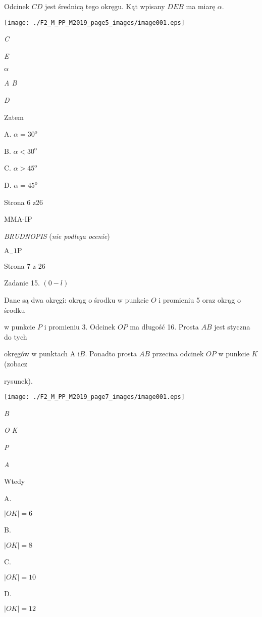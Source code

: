 \documentclass[a4paper,12pt]{article}
\begin{document}
Odcinek $CD$ jest średnicą tego okręgu. Kąt wpisany $DEB$ ma miarę $\alpha.$
\begin{center}
\texttt{[image: ./F2\_M\_PP\_M2019\_page5\_images/image001.eps]}
\end{center}
{\it C}

{\it E}

$\alpha$

{\it A  B}

{\it D}

Zatem

A. $\alpha=30^{\mathrm{o}}$

B. $\alpha<30^{\mathrm{o}}$

C. $\alpha>45^{\mathrm{o}}$

D. $\alpha=45^{\mathrm{o}}$

Strona 6 z26

MMA-IP





{\it BRUDNOPIS} ({\it nie podlega ocenie})

$\mathrm{A}_{-}1\mathrm{P}$

Strona 7 z 26





Zadanie 15. $(0-l)$

Dane są dwa okręgi: okrąg o środku w punkcie $O$ i promieniu 5 oraz okrąg o środku

w punkcie $P$ i promieniu 3. Odcinek $OP$ ma długość 16. Prosta $AB$ jest styczna do tych

okręgów w punktach A $\mathrm{i}B$. Ponadto prosta $AB$ przecina odcinek $OP$ w punkcie $K$ (zobacz

rysunek).
\begin{center}
\texttt{[image: ./F2\_M\_PP\_M2019\_page7\_images/image001.eps]}
\end{center}
{\it B}

{\it O  K}

{\it P}

{\it A}

Wtedy

A.

$|OK|=6$

B.

$|OK|=8$

C.

$|OK|=10$

D.

$|OK|=12$
\end{document}
